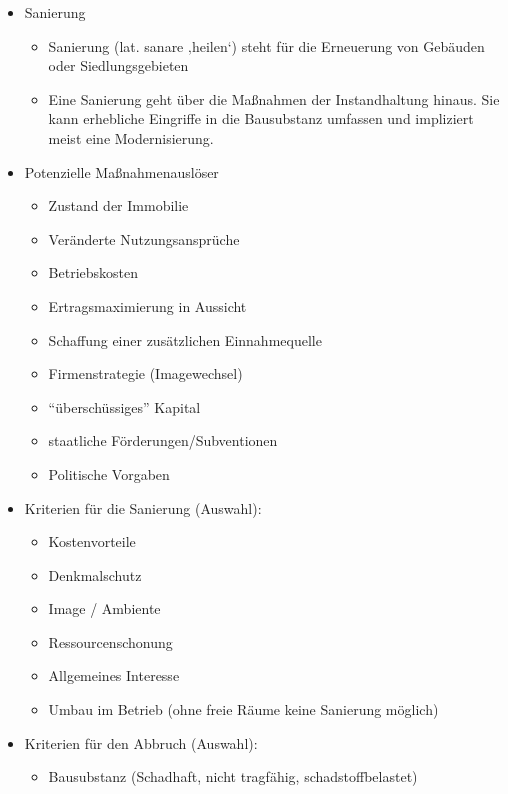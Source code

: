 \documentclass[fleqn,twoside,dvipsnames]{article}
\begin{document}
    \begin{itemize}
        \item Sanierung
            \begin{itemize}
                \item Sanierung (lat. sanare ‚heilen‘) steht für die Erneuerung von Gebäuden oder Siedlungsgebieten
                \item Eine Sanierung geht über die Maßnahmen der Instandhaltung hinaus. Sie kann erhebliche Eingriffe in die Bausubstanz umfassen und impliziert meist eine Modernisierung. 
            \end{itemize}
        \item Potenzielle Maßnahmenauslöser
            \begin{itemize}
                \item Zustand der Immobilie
                \item Veränderte Nutzungsansprüche
                \item Betriebskosten
                \item Ertragsmaximierung in Aussicht
                \item Schaffung einer zusätzlichen Einnahmequelle
                \item Firmenstrategie (Imagewechsel)
                \item \enquote{überschüssiges} Kapital
                \item staatliche Förderungen/Subventionen
                \item Politische Vorgaben
            \end{itemize}
        \item Kriterien für die Sanierung (Auswahl):
            \begin{itemize}
                \item Kostenvorteile
                \item Denkmalschutz
                \item Image / Ambiente
                \item Ressourcenschonung
                \item Allgemeines Interesse
                \item Umbau im Betrieb (ohne freie Räume keine Sanierung möglich)
            \end{itemize}
        \item Kriterien für den Abbruch (Auswahl):
            \begin{itemize}
                \item Bausubstanz (Schadhaft, nicht tragfähig, schadstoffbelastet)

\end{itemize}
\end{itemize}
\end{document}
